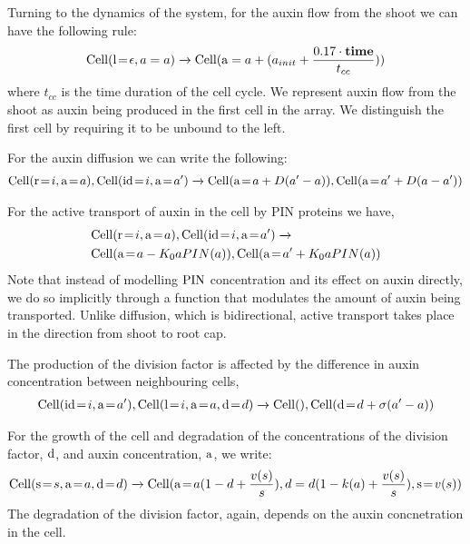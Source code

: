 Turning to the dynamics of the system, for the auxin flow from the shoot we can
have the following rule:
\begin{align*}
\mathrm{Cell}(\mathrm{l} \!=\! \epsilon, a=a) \xrightarrow{} \mathrm{Cell}(\mathrm{a}=a + (a_{init} + \frac{0.17 \cdot \mathbf{time}}{t_{cc}}))
\end{align*}
where $t_{cc}$ is the time duration of the cell cycle. We represent auxin flow
from the shoot as auxin being produced in the first cell in the array. We
distinguish the first cell by requiring it to be unbound to the left. 

For the auxin diffusion we can write the following:
\begin{align*}
\mr{Cell}(\ar{r}{i}, \ar{a}{a}), \mr{Cell}(\ar{id}{i}, \ar{a}{a'})
  \xrightarrow{} \mr{Cell}(\ar{a}{a + D(a'-a)}), \mr{Cell}(\ar{a}{a' + D(a - a')})
\end{align*}

For the active transport of auxin in the cell by PIN proteins we have,
\begin{align*}
& \mr{Cell}(\ar{r}{i}, \ar{a}{a}), \mr{Cell}(\ar{id}{i}, \ar{a}{a'})
                 \xrightarrow{} \\
  &\mr{Cell}(\ar{a}{a - K_0 a PIN(a)}), \mr{Cell}(\ar{a}{a' + K_0
  a PIN(a)})
\end{align*}
Note that instead of modelling $\mathrm{PIN}$ concentration and its effect on auxin
directly, we do so implicitly through a function that modulates the
amount of auxin being transported. Unlike diffusion, which is bidirectional,
active transport takes place in the direction from shoot to root cap.

The production of the division factor is affected by the difference in auxin
concentration between neighbouring cells,
\begin{align*}
\mr{Cell}(\ar{id}{i}, \ar{a}{a'}), \mr{Cell}(\ar{l}{i}, \ar{a}{a}, \ar{d}{d})
  \xrightarrow{} \mr{Cell}(), \mr{Cell}(\ar{d}{d+\sigma(a'-a)})
\end{align*}

For the growth of the cell and degradation of the concentrations of the division
factor, $\mathrm{d}$, and auxin concentration, $\mathrm{a}$, we write:
\begin{align*}
\mr{Cell}(\ar{s}{s}, \ar{a}{a}, \ar{d}{d}) \xrightarrow{} \mr{Cell}(\ar{a}{a (1 - d +
  \frac{v(s)}{s})}, d=d (1 - k(a) + \frac{v(s)}{s}), \ar{s}{v(s)})
\end{align*}
The degradation of the division factor, again, depends on the auxin
concnetration in the cell.

